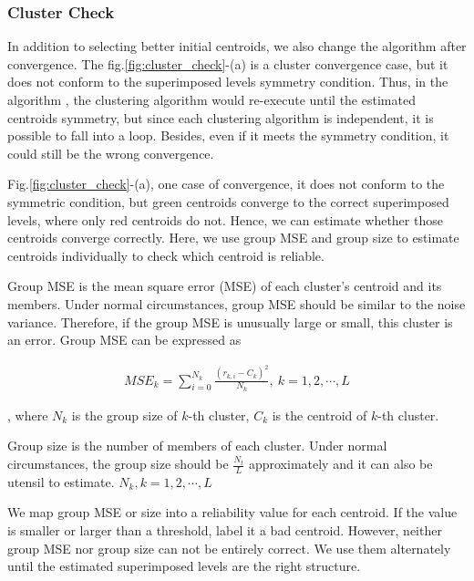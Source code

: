 \subsubsection{Cluster Check}

In addition to selecting better initial centroids, we also change the algorithm after convergence. The fig.\ref{fig:cluster_check}-(a) is a cluster convergence case, but it does not conform to the superimposed levels symmetry condition. Thus, in the algorithm \cite{yt19}, the clustering algorithm would re-execute until the estimated centroids symmetry, but since each clustering algorithm is independent, it is possible to fall into a loop. Besides, even if it meets the symmetry condition, it could still be the wrong convergence.

Fig.\ref{fig:cluster_check}-(a), one case of convergence, it does not conform to the symmetric condition, but green centroids converge to the correct superimposed levels, where only red centroids do not. Hence, we can estimate whether those centroids converge correctly. Here, we use group MSE and group size to estimate centroids individually to check which centroid is reliable. 

Group MSE is the mean square error (MSE) of each cluster's centroid and its members. Under normal circumstances, group MSE should be similar to the noise variance. Therefore, if the group MSE is unusually large or small, this cluster is an error. Group MSE can be expressed as



\begin{align}
MSE_k = \sum^{N_{k}}_{i=0} \frac{{(r_{k,i} - C_k)}^2}{N_k}, \ k=1,2,\cdots,L
\end{align}

, where $N_k$ is the group size of $k$-th cluster, $C_k$ is the centroid of $k$-th cluster.


Group size is the number of members of each cluster. Under normal circumstances, the group size should be $\frac{N_t}{L}$ approximately and it can also be utensil to estimate. $N_k,k=1,2, \cdots, L$

We map group MSE or size into a reliability value for each centroid. If the value is smaller or larger than a threshold, label it a bad centroid. However, neither group MSE nor group size can not be entirely correct. We use them alternately until the estimated superimposed levels are the right structure.



